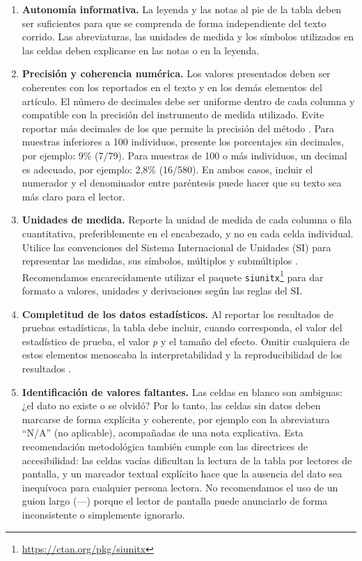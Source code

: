 \documentclass[spanish]{rbie2026}%
\begin{document}
\begin{enumerate}
  \item \textbf{Autonomía informativa.} La leyenda y las notas al pie de la tabla deben ser suficientes para que se comprenda de forma independiente del texto corrido. Las abreviaturas, las unidades de medida y los símbolos utilizados en las celdas deben explicarse en las notas o en la leyenda.

  \item \textbf{Precisión y coherencia numérica.} Los valores presentados deben ser coherentes con los reportados en el texto y en los demás elementos del artículo. El número de decimales debe ser uniforme dentro de cada columna y compatible con la precisión del instrumento de medida utilizado. Evite reportar más decimales de los que permite la precisión del método \citep{Cole_too_many_digits}. Para muestras inferiores a 100 individuos, presente los porcentajes sin decimales, por ejemplo: 9\% (7/79). Para muestras de 100 o más individuos, un decimal es adecuado, por ejemplo: 2,8\% (16/580). En ambos casos, incluir el numerador y el denominador entre paréntesis puede hacer que su texto sea más claro para el lector.

  \item \textbf{Unidades de medida.} Reporte la unidad de medida de cada columna o fila cuantitativa, preferiblemente en el encabezado, y no en cada celda individual. Utilice las convenciones del Sistema Internacional de Unidades (SI) para representar las medidas, sus símbolos, múltiplos y submúltiplos \citep{Inmetro2025SI}. Recomendamos encarecidamente utilizar el paquete \texttt{siunitx}\footnote{\url{https://ctan.org/pkg/siunitx}} para dar formato a valores, unidades y derivaciones según las reglas del SI.

  \item \textbf{Completitud de los datos estadísticos.} Al reportar los resultados de pruebas estadísticas, la tabla debe incluir, cuando corresponda, el valor del estadístico de prueba, el valor \textit{p} y el tamaño del efecto. Omitir cualquiera de estos elementos menoscaba la interpretabilidad y la reproducibilidad de los resultados \citep{Cohen1988}.

  \item \textbf{Identificación de valores faltantes.} Las celdas en blanco son ambiguas: ¿el dato no existe o se olvidó? Por lo tanto, las celdas sin datos deben marcarse de forma explícita y coherente, por ejemplo con la abreviatura ``N/A'' (no aplicable), acompañadas de una nota explicativa. Esta recomendación metodológica también cumple con las directrices de accesibilidad: las celdas vacías dificultan la lectura de la tabla por lectores de pantalla, y un marcador textual explícito hace que la ausencia del dato sea inequívoca para cualquier persona lectora. No recomendamos el uso de un guion largo (---) porque el lector de pantalla puede anunciarlo de forma inconsistente o simplemente ignorarlo.
  

\end{enumerate}
\end{document}
